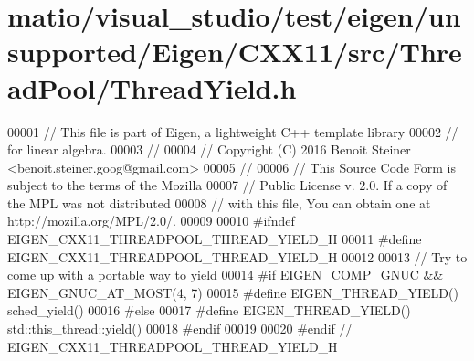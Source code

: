 \hypertarget{matio_2visual__studio_2test_2eigen_2unsupported_2_eigen_2_c_x_x11_2src_2_thread_pool_2_thread_yield_8h_source}{}\section{matio/visual\+\_\+studio/test/eigen/unsupported/\+Eigen/\+C\+X\+X11/src/\+Thread\+Pool/\+Thread\+Yield.h}
\label{matio_2visual__studio_2test_2eigen_2unsupported_2_eigen_2_c_x_x11_2src_2_thread_pool_2_thread_yield_8h_source}

\begin{DoxyCode}
00001 \textcolor{comment}{// This file is part of Eigen, a lightweight C++ template library}
00002 \textcolor{comment}{// for linear algebra.}
00003 \textcolor{comment}{//}
00004 \textcolor{comment}{// Copyright (C) 2016 Benoit Steiner <benoit.steiner.goog@gmail.com>}
00005 \textcolor{comment}{//}
00006 \textcolor{comment}{// This Source Code Form is subject to the terms of the Mozilla}
00007 \textcolor{comment}{// Public License v. 2.0. If a copy of the MPL was not distributed}
00008 \textcolor{comment}{// with this file, You can obtain one at http://mozilla.org/MPL/2.0/.}
00009 
00010 \textcolor{preprocessor}{#ifndef EIGEN\_CXX11\_THREADPOOL\_THREAD\_YIELD\_H}
00011 \textcolor{preprocessor}{#define EIGEN\_CXX11\_THREADPOOL\_THREAD\_YIELD\_H}
00012 
00013 \textcolor{comment}{// Try to come up with a portable way to yield}
00014 \textcolor{preprocessor}{#if EIGEN\_COMP\_GNUC && EIGEN\_GNUC\_AT\_MOST(4, 7)}
00015 \textcolor{preprocessor}{#define EIGEN\_THREAD\_YIELD() sched\_yield()}
00016 \textcolor{preprocessor}{#else}
00017 \textcolor{preprocessor}{#define EIGEN\_THREAD\_YIELD() std::this\_thread::yield()}
00018 \textcolor{preprocessor}{#endif}
00019 
00020 \textcolor{preprocessor}{#endif  // EIGEN\_CXX11\_THREADPOOL\_THREAD\_YIELD\_H}
\end{DoxyCode}
